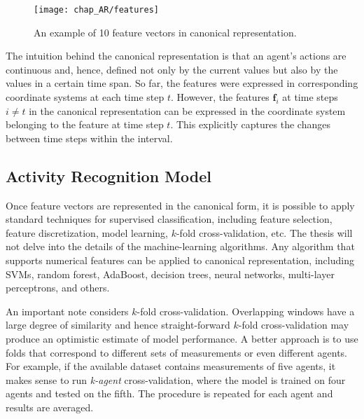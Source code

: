 \begin{figure}[!h]
\centering
\texttt{[image: chap\_AR/features]}
\caption{An example of 10 feature vectors in canonical representation.}
\label{fig:canonical}
\end{figure}

The intuition behind the canonical representation is that an agent's actions are continuous and, hence, defined not only by the current values but also by the values in a certain time span. 
So far, the features were expressed in corresponding coordinate systems at each time step $t$. However, the features $\mathbf{f}_i$ at time steps $i \not= t$ in the canonical representation can be expressed in the coordinate system belonging to the feature at time step $t$. This explicitly captures the changes between time steps within the interval. 





\subsection{Activity Recognition Model}
\label{sec:ArModel}
Once feature vectors are represented in the canonical form, it is possible to apply standard techniques for supervised classification, including feature selection, feature discretization, model learning, $k$-fold cross-validation, etc. The thesis will not delve into the details of the machine-learning algorithms. Any algorithm that supports numerical features can be applied to canonical representation, including SVMs, random forest, AdaBoost, decision trees, neural networks, multi-layer perceptrons, and others.

An important note considers $k$-fold cross-validation. Overlapping windows have a large degree of similarity and hence straight-forward $k$-fold cross-validation may produce an optimistic estimate of model performance. A better approach is to use folds that correspond to different sets of measurements or even different agents. For example, if the available dataset contains measurements of five agents, it makes sense to run {\it k-agent} cross-validation, where the model is trained on four agents and tested on the fifth.  The procedure is repeated for each agent and results are averaged.

